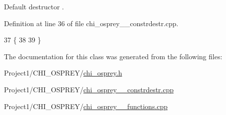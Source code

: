 Default destructor . 

Definition at line 36 of file chi\+\_\+osprey\+\_\+\_\+constrdestr.\+cpp.


\begin{DoxyCode}
37 \{
38 
39 \}
\end{DoxyCode}


The documentation for this class was generated from the following files\+:\begin{DoxyCompactItemize}
\item 
Project1/\+C\+H\+I\+\_\+\+O\+S\+P\+R\+E\+Y/\hyperlink{chi__osprey_8h}{chi\+\_\+osprey.\+h}\item 
Project1/\+C\+H\+I\+\_\+\+O\+S\+P\+R\+E\+Y/\hyperlink{chi__osprey__00__constrdestr_8cpp}{chi\+\_\+osprey\+\_\+\_\+constrdestr.\+cpp}\item 
Project1/\+C\+H\+I\+\_\+\+O\+S\+P\+R\+E\+Y/\hyperlink{chi__osprey__01__functions_8cpp}{chi\+\_\+osprey\+\_\+\_\+functions.\+cpp}\end{DoxyCompactItemize}
